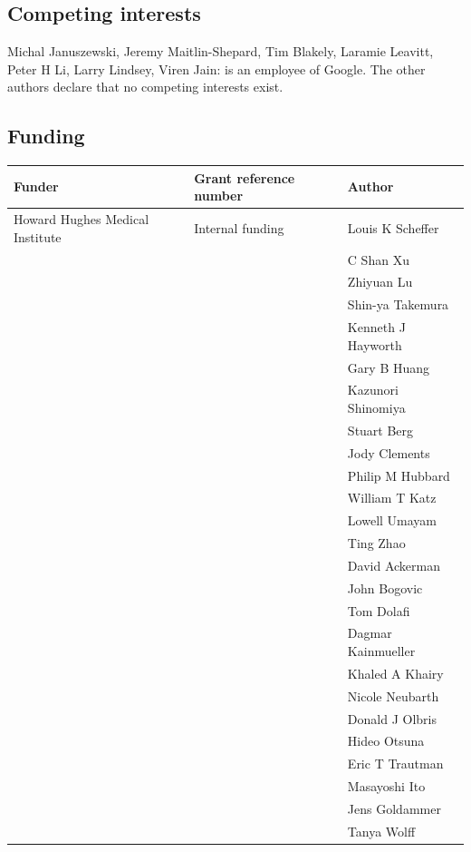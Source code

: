 \documentclass{article}
\begin{document}
\subsection*{Competing interests}

Michal Januszewski, Jeremy Maitlin-Shepard, Tim Blakely, Laramie Leavitt, Peter H Li, Larry Lindsey, Viren Jain: is an employee of Google. The other authors declare that no competing interests exist.


\subsection*{Funding}

\begin{center}\footnotesize
\begin{longtable}{lll}
\textbf{Funder} & \textbf{Grant reference number} & \textbf{Author} \\
\hline
Howard Hughes Medical Institute & Internal funding & Louis K Scheffer \\
 &  & C Shan Xu \\
 &  & Zhiyuan Lu \\
 &  & Shin-ya Takemura \\
 &  & Kenneth J Hayworth \\
 &  & Gary B Huang \\
 &  & Kazunori Shinomiya \\
 &  & Stuart Berg \\
 &  & Jody Clements \\
 &  & Philip M Hubbard \\
 &  & William T Katz \\
 &  & Lowell Umayam \\
 &  & Ting Zhao \\
 &  & David Ackerman \\
 &  & John Bogovic \\
 &  & Tom Dolafi \\
 &  & Dagmar Kainmueller \\
 &  & Khaled A Khairy \\
 &  & Nicole Neubarth \\
 &  & Donald J Olbris \\
 &  & Hideo Otsuna \\
 &  & Eric T Trautman \\
 &  & Masayoshi Ito \\
 &  & Jens Goldammer \\
 &  & Tanya Wolff \\

\end{longtable}
\end{center}
\end{document}
